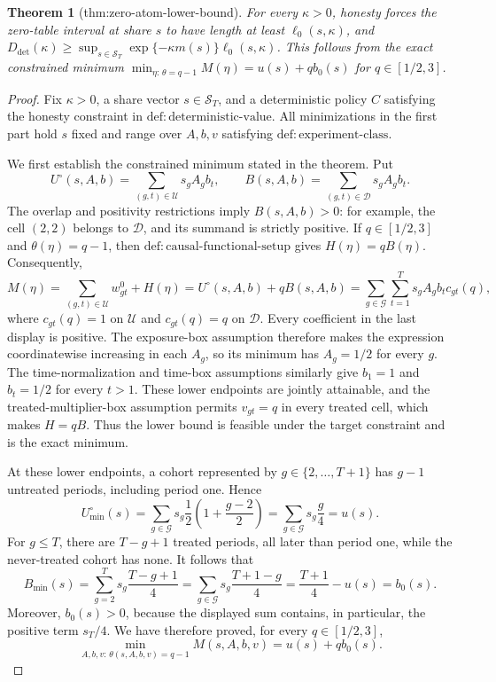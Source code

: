 \documentclass{article}
\newtheorem{theorem}{Theorem}
\begin{document}
\begin{theorem}[thm:zero-atom-lower-bound]\label{thm:zero-atom-lower-bound}
For every \(\kappa>0\), honesty forces the zero-table interval at share \(s\) to have length at least \(\ell_0(s,\kappa)\), and \(D_{\mathrm{det}}(\kappa)\ge\sup_{s\in\mathcal S_T}\exp\{-\kappa m(s)\}\ell_0(s,\kappa)\). This follows from the exact constrained minimum \(\min_{\eta:\,\theta=q-1}M(\eta)=u(s)+qb_0(s)\) for \(q\in[1/2,3]\).
\end{theorem}
\begin{proof}
Fix \(\kappa>0\), a share vector \(s\in\mathcal S_T\), and a deterministic policy \(C\) satisfying the honesty constraint in \(\mathrm{def{:}deterministic\text{-}value}\).  All minimizations in the first part hold \(s\) fixed and range over \(A,b,v\) satisfying \(\mathrm{def{:}experiment\text{-}class}\).

We first establish the constrained minimum stated in the theorem.  Put
\[
 U^{\circ}(s,A,b)=\sum_{(g,t)\in\mathcal U}s_gA_gb_t,
 \qquad
 B(s,A,b)=\sum_{(g,t)\in\mathcal D}s_gA_gb_t.
\]
The overlap and positivity restrictions imply \(B(s,A,b)>0\): for example, the cell \((2,2)\) belongs to \(\mathcal D\), and its summand is strictly positive.  If \(q\in[1/2,3]\) and \(\theta(\eta)=q-1\), then \(\mathrm{def{:}causal\text{-}functional\text{-}setup}\) gives \(H(\eta)=qB(\eta)\).  Consequently,
\[
 M(\eta)
 =\sum_{(g,t)\in\mathcal U}w^0_{gt}+H(\eta)
 =U^{\circ}(s,A,b)+qB(s,A,b)
 =\sum_{g\in\mathcal G}\sum_{t=1}^T
 s_gA_gb_t c_{gt}(q),
 \]
where \(c_{gt}(q)=1\) on \(\mathcal U\) and \(c_{gt}(q)=q\) on \(\mathcal D\).  Every coefficient in the last display is positive.  The exposure-box assumption therefore makes the expression coordinatewise increasing in each \(A_g\), so its minimum has \(A_g=1/2\) for every \(g\).  The time-normalization and time-box assumptions similarly give \(b_1=1\) and \(b_t=1/2\) for every \(t>1\).  These lower endpoints are jointly attainable, and the treated-multiplier-box assumption permits \(v_{gt}=q\) in every treated cell, which makes \(H=qB\).  Thus the lower bound is feasible under the target constraint and is the exact minimum.

At these lower endpoints, a cohort represented by \(g\in\{2,\ldots,T+1\}\) has \(g-1\) untreated periods, including period one.  Hence
\[
 U^{\circ}_{\min}(s)
 =\sum_{g\in\mathcal G}s_g\frac12
 \left(1+\frac{g-2}{2}\right)
 =\sum_{g\in\mathcal G}s_g\frac g4
 =u(s).
\]
For \(g\le T\), there are \(T-g+1\) treated periods, all later than period one, while the never-treated cohort has none.  It follows that
\[
 B_{\min}(s)
 =\sum_{g=2}^{T}s_g\frac{T-g+1}{4}
 =\sum_{g\in\mathcal G}s_g\frac{T+1-g}{4}
 =\frac{T+1}{4}-u(s)
 =b_0(s).
\]
Moreover, \(b_0(s)>0\), because the displayed sum contains, in particular, the positive term \(s_T/4\).  We have therefore proved, for every \(q\in[1/2,3]\),
\[
 \min_{A,b,v:\,\theta(s,A,b,v)=q-1}M(s,A,b,v)
 =u(s)+q b_0(s).
 \tag{1}
\]


\end{proof}
\end{document}
